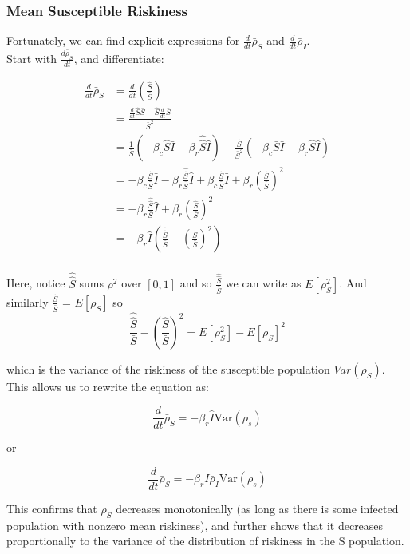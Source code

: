 \documentclass{article}
\begin{document}
{\subsubsection{Mean Susceptible Riskiness}

Fortunately, we can find explicit expressions for $\frac{d}{dt}\bar\rho_S$
and $\frac{d}{dt}\bar\rho_I$.\\

Start with $\frac{d\bar\rho_S}{dt}$, and differentiate:


\begin{align*}
\frac{d}{dt}\bar\rho_S
&= \frac{d}{dt} \left( \frac{\hat S}{\bar S} \right)\\
&= \frac{\frac{d}{dt} \hat S \bar S - \hat S \frac{d}{dt}\bar S}{\bar S^2}\\
&= \frac{1}{\bar S}\left(
-\beta_c\hat S \bar I - \beta_r \hat{\hat{S}}\hat I
\right)
- \frac{\hat S}{\bar S^2}\left(
-\beta_c \bar S \bar I - \beta_r \hat S \hat I
\right)\\
&= -\beta_c \frac{\hat S}{\bar S} \bar I
- \beta_r \frac{\hat{\hat{S}}}{\bar S}\hat{I}
+ \beta_c \frac{\hat S}{\bar S}\bar I
+ \beta_r \left(\frac{\hat S}{\bar S}\right)^2 \\
&= 
- \beta_r \frac{\hat{\hat{S}}}{\bar S}\hat{I}
+ \beta_r \left(\frac{\hat S}{\bar S}\right)^2 \\
&= -\beta_r \hat I \left(\frac{\hat{ \hat{ S}}}{\bar S} - \left(\frac{\hat S}{\bar S}\right)^2  \right)\\
\end{align*}

Here, notice $\hat{ \hat{ S}}$ sums $\rho^2$ over $[0, 1]$ and so
$\frac{\hat{ \hat{ S}}}{\bar S}$ we can write as $E[\rho_S^2]$. And similarly
$\frac{\hat S}{\bar S}$ = $E[\rho_S]$ so
$$
\frac{\hat{ \hat{ S}}}{\bar S} - \left(\frac{\hat S}{\bar S}\right)^2
= E[\rho_S^2] - E[\rho_S]^2 
$$

which is the variance of the riskiness of the susceptible population
$Var(\rho_S)$. This allows us to rewrite the equation as:

$$
\frac{d}{dt}\bar\rho_S = -\beta_r \hat I \text{Var}(\rho_s)
$$

or

$$
\frac{d}{dt}\bar\rho_S = -\beta_r \bar I \bar\rho_I \text{Var}(\rho_s)
$$

This confirms that $\rho_S$ decreases monotonically (as long as there is some
infected population with nonzero mean riskiness), and further shows that
it decreases proportionally to the variance of the distribution of riskiness
in the S population.

}
\end{document}
